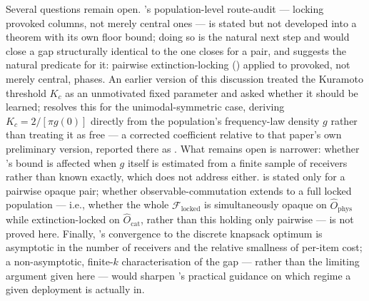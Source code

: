 \documentclass[11pt,twocolumn,a4paper]{article}
\theoremstyle{rdm}
\theoremstyle{definition}
\theoremstyle{remark}
\newcommand{\Fed}{\mathcal{F}}
\begin{document}
Several questions remain open. 's
population-level route-audit — locking provoked columns, not merely central
ones — is stated but not developed into a theorem with its own floor bound;
doing so is the natural next step and would close a gap structurally
identical to the one  closes for a pair, and
 suggests the natural predicate for it: pairwise
extinction-locking () applied to provoked, not
merely central, phases. An earlier version of this discussion treated the
Kuramoto threshold $K_c$ as an unmotivated fixed parameter and asked
whether it should be learned; \citet[Thm.~5]{sachikonye-coordination-regimes}
resolves this for the unimodal-symmetric case, deriving
$K_c=2/[\pi g(0)]$ directly from the population's frequency-law density
$g$ rather than treating it as free — a corrected coefficient relative to
that paper's own preliminary version, reported there as
\citet[Rem.~11]{sachikonye-coordination-regimes}. What remains open is
narrower: whether 's bound is affected when
$g$ itself is estimated from a finite sample of receivers rather than
known exactly, which \citet{sachikonye-coordination-regimes} does not
address either.  is stated only for a
pairwise opaque pair; whether observable-commutation extends to a full
locked population — i.e., whether the whole $\Fed_{\mathrm{locked}}$ is
simultaneously opaque on $\hat O_{\mathrm{phys}}$ while extinction-locked
on $\hat O_{\mathrm{cat}}$, rather than this holding only pairwise — is not
proved here. Finally, 's convergence to the
discrete knapsack optimum is asymptotic in the number of receivers and the
relative smallness of per-item cost; a non-asymptotic, finite-$k$
characterisation of the gap — rather than the limiting argument given
here — would sharpen 's practical guidance on
which regime a given deployment is actually in.



\end{document}
